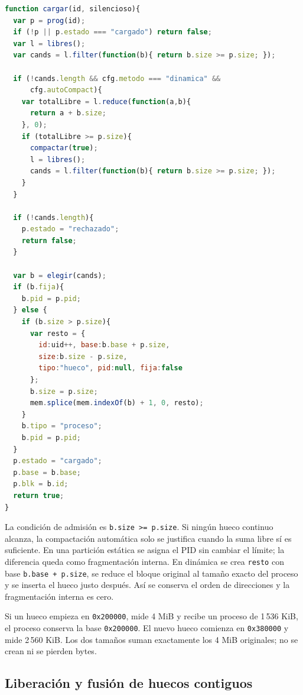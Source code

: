 \documentclass[11pt,a4paper]{article}
\begin{document}
\begin{lstlisting}[language=JavaScript,caption={Búsqueda, compactación automática y admisión.}]
function cargar(id, silencioso){
  var p = prog(id);
  if (!p || p.estado === "cargado") return false;
  var l = libres();
  var cands = l.filter(function(b){ return b.size >= p.size; });

  if (!cands.length && cfg.metodo === "dinamica" &&
      cfg.autoCompact){
    var totalLibre = l.reduce(function(a,b){
      return a + b.size;
    }, 0);
    if (totalLibre >= p.size){
      compactar(true);
      l = libres();
      cands = l.filter(function(b){ return b.size >= p.size; });
    }
  }

  if (!cands.length){
    p.estado = "rechazado";
    return false;
  }

  var b = elegir(cands);
  if (b.fija){
    b.pid = p.pid;
  } else {
    if (b.size > p.size){
      var resto = {
        id:uid++, base:b.base + p.size,
        size:b.size - p.size,
        tipo:"hueco", pid:null, fija:false
      };
      b.size = p.size;
      mem.splice(mem.indexOf(b) + 1, 0, resto);
    }
    b.tipo = "proceso";
    b.pid = p.pid;
  }
  p.estado = "cargado";
  p.base = b.base;
  p.blk = b.id;
  return true;
}
\end{lstlisting}

La condición de admisión es \texttt{b.size >= p.size}. Si ningún hueco continuo
alcanza, la compactación automática solo se justifica cuando la suma libre sí es
suficiente. En una partición estática se asigna el PID sin cambiar el límite; la
diferencia queda como fragmentación interna. En dinámica se crea \texttt{resto}
con base \texttt{b.base + p.size}, se reduce el bloque original al tamaño exacto
del proceso y se inserta el hueco justo después. Así se conserva el orden de
direcciones y la fragmentación interna es cero.

\begin{nota}
Si un hueco empieza en \texttt{0x200000}, mide 4 MiB y recibe un proceso de
1\,536 KiB, el proceso conserva la base \texttt{0x200000}. El nuevo hueco comienza
en \texttt{0x380000} y mide 2\,560 KiB. Los dos tamaños suman exactamente los
4 MiB originales; no se crean ni se pierden bytes.
\end{nota}

\subsection{Liberación y fusión de huecos contiguos}
\end{document}
